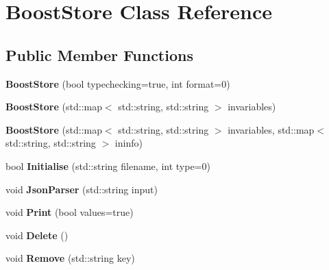 \hypertarget{classBoostStore}{\section{Boost\-Store Class Reference}
\label{classBoostStore}
}
\subsection*{Public Member Functions}
\begin{DoxyCompactItemize}
\item 
\hypertarget{classBoostStore_af359015c3ca44cd24fd915ec7bb008b4}{{\bfseries Boost\-Store} (bool typechecking=true, int format=0)}\label{classBoostStore_af359015c3ca44cd24fd915ec7bb008b4}

\item 
\hypertarget{classBoostStore_af114bcb7df59af05e5715af756771379}{{\bfseries Boost\-Store} (std\-::map$<$ std\-::string, std\-::string $>$ invariables)}\label{classBoostStore_af114bcb7df59af05e5715af756771379}

\item 
\hypertarget{classBoostStore_a57b996f894624e61e8f57bf495f00c07}{{\bfseries Boost\-Store} (std\-::map$<$ std\-::string, std\-::string $>$ invariables, std\-::map$<$ std\-::string, std\-::string $>$ ininfo)}\label{classBoostStore_a57b996f894624e61e8f57bf495f00c07}

\item 
\hypertarget{classBoostStore_ada96e21cf2ffd6872dd1523ac6a5316b}{bool {\bfseries Initialise} (std\-::string filename, int type=0)}\label{classBoostStore_ada96e21cf2ffd6872dd1523ac6a5316b}

\item 
\hypertarget{classBoostStore_a6380dcf800764516378adc5552f63114}{void {\bfseries Json\-Parser} (std\-::string input)}\label{classBoostStore_a6380dcf800764516378adc5552f63114}

\item 
\hypertarget{classBoostStore_ac88d4b1cd17889c85d4acfca3a2b2acc}{void {\bfseries Print} (bool values=true)}\label{classBoostStore_ac88d4b1cd17889c85d4acfca3a2b2acc}

\item 
\hypertarget{classBoostStore_a99c755b996ad99c9d610dd48ffb78f17}{void {\bfseries Delete} ()}\label{classBoostStore_a99c755b996ad99c9d610dd48ffb78f17}

\item 
\hypertarget{classBoostStore_a649b15bdd2710f3caa464f2ffd443101}{void {\bfseries Remove} (std\-::string key)}\label{classBoostStore_a649b15bdd2710f3caa464f2ffd443101}


\end{DoxyCompactItemize}
